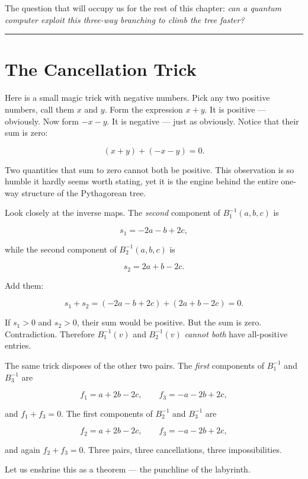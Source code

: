 \documentclass[11pt,openany]{book}
\theoremstyle{definition}
\theoremstyle{plain}
\theoremstyle{remark}
\begin{document}
The question that will occupy us for the rest of this chapter: \textit{can a quantum computer exploit this three-way branching to climb the tree faster?}

\bigskip\noindent\rule{\textwidth}{0.4pt}\bigskip


\section*{The Cancellation Trick}


Here is a small magic trick with negative numbers. Pick any two positive numbers, call them $x$ and $y$. Form the expression $x + y$. It is positive — obviously. Now form $-x - y$. It is negative — just as obviously. Notice that their sum is zero:

$$(x + y) + (-x - y) = 0.$$

Two quantities that sum to zero cannot both be positive. This observation is so humble it hardly seems worth stating, yet it is the engine behind the entire one-way structure of the Pythagorean tree.

Look closely at the inverse maps. The \textit{second} component of $B_1^{-1}(a, b, c)$ is

$$s_1 = -2a - b + 2c,$$

while the second component of $B_2^{-1}(a, b, c)$ is

$$s_2 = 2a + b - 2c.$$

Add them:

$$s_1 + s_2 = (-2a - b + 2c) + (2a + b - 2c) = 0.$$

If $s_1 > 0$ and $s_2 > 0$, their sum would be positive. But the sum is zero. Contradiction. Therefore $B_1^{-1}(v)$ and $B_2^{-1}(v)$ \textit{cannot both} have all-positive entries.

The same trick disposes of the other two pairs. The \textit{first} components of $B_1^{-1}$ and $B_3^{-1}$ are

$$f_1 = a + 2b - 2c, \qquad f_3 = -a - 2b + 2c,$$

and $f_1 + f_3 = 0$. The first components of $B_2^{-1}$ and $B_3^{-1}$ are

$$f_2 = a + 2b - 2c, \qquad f_3 = -a - 2b + 2c,$$

and again $f_2 + f_3 = 0$. Three pairs, three cancellations, three impossibilities.

Let us enshrine this as a theorem — the punchline of the labyrinth.
\end{document}
